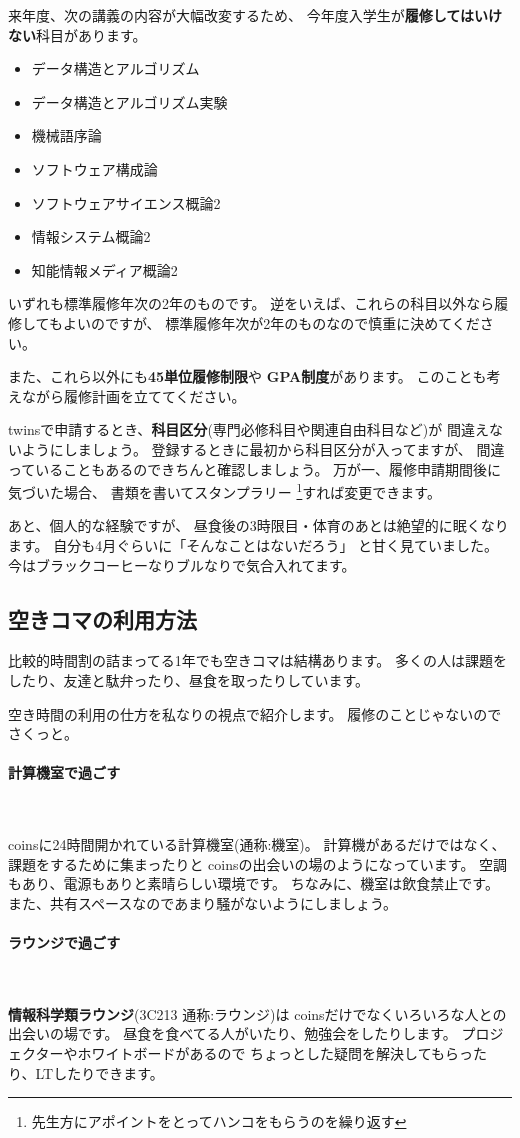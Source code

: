 \documentclass[a4j]{jsarticle}
\newcommand{\note}[1]{{\color{red} #1}}
\newcommand{\RA}{{\color{red}\large RED ALERT}}
\newcommand{\bold}[1]{{\bfseries #1}}
\newcommand{\parapara}[1]{\paragraph{#1}~\par}
\renewcommand{\note}[1]{}\renewcommand{\RA}{}
\begin{document}
来年度、次の講義の内容が大幅改変するため、
今年度入学生が\bold{履修してはいけない}科目があります。
{\small\begin{itemize}
	\item データ構造とアルゴリズム
	\item データ構造とアルゴリズム実験
	\item 機械語序論
	\item ソフトウェア構成論
	\item ソフトウェアサイエンス概論2
	\item 情報システム概論2
	\item 知能情報メディア概論2
\end{itemize}}
いずれも標準履修年次の2年のものです。
逆をいえば、これらの科目以外なら履修してもよいのですが、
標準履修年次が2年のものなので慎重に決めてください。
\vspace{2mm}

また、これら以外にも\bold{45単位履修制限}や
\bold{GPA制度}があります。
このことも考えながら履修計画を立ててください。

twinsで申請するとき、\bold{科目区分}(専門必修科目や関連自由科目など)が
間違えないようにしましょう。
登録するときに最初から科目区分が入ってますが、
間違っていることもあるのできちんと確認しましょう。
万が一、履修申請期間後に気づいた場合、
書類を書いてスタンプラリー
\footnote{先生方にアポイントをとってハンコをもらうのを繰り返す}すれば変更できます。

あと、個人的な経験ですが、
昼食後の3時限目・体育のあとは絶望的に眠くなります。
自分も4月ぐらいに「そんなことはないだろう」
と甘く見ていました。
今はブラックコーヒーなりブルなりで気合入れてます。


\subsection{空きコマの利用方法}
比較的時間割の詰まってる1年でも空きコマは結構あります。
多くの人は課題をしたり、友達と駄弁ったり、昼食を取ったりしています。

空き時間の利用の仕方を私なりの視点で紹介します。
履修のことじゃないのでさくっと。

\newpage
\parapara{計算機室で過ごす}
coinsに24時間開かれている計算機室(通称:機室)。
計算機があるだけではなく、
課題をするために集まったりと
coinsの出会いの場のようになっています。
空調もあり、電源もありと素晴らしい環境です。
ちなみに、機室は飲食禁止です。
また、共有スペースなのであまり騒がないようにしましょう。

\parapara{ラウンジで過ごす}
\bold{情報科学類ラウンジ}(3C213\note{直した} 通称:ラウンジ)は
coinsだけでなくいろいろな人との出会いの場です。
昼食を食べてる人がいたり、勉強会をしたりします。
プロジェクターやホワイトボードがあるので
ちょっとした疑問を解決してもらったり、LTしたりできます。
\end{document}

